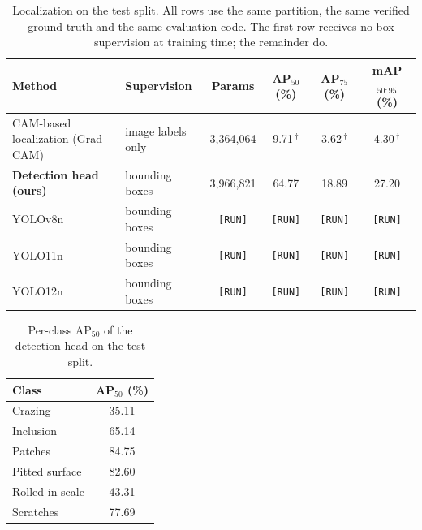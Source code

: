 \begin{table}[t]
\centering
\caption{Localization on the test split. All rows use the same partition, the same verified ground truth and the same evaluation code. The first row receives no box supervision at training time; the remainder do.}
\label{tab:localization}
\renewcommand{\arraystretch}{1.15}
\begin{tabular}{llcccc}
\toprule
\textbf{Method} & \textbf{Supervision} & \textbf{Params} & \textbf{AP$_{50}$ (\%)} & \textbf{AP$_{75}$ (\%)} & \textbf{mAP$_{50:95}$ (\%)} \\
\midrule
CAM-based localization (Grad-CAM) & image labels only & 3{,}364{,}064 & 9.71\,$^{\dagger}$ & 3.62\,$^{\dagger}$ & 4.30\,$^{\dagger}$ \\
\midrule
\textbf{Detection head (ours)} & bounding boxes & 3{,}966{,}821 & 64.77 & 18.89 & 27.20 \\
YOLOv8n & bounding boxes & \texttt{[RUN]} & \texttt{[RUN]} & \texttt{[RUN]} & \texttt{[RUN]} \\
YOLO11n & bounding boxes & \texttt{[RUN]} & \texttt{[RUN]} & \texttt{[RUN]} & \texttt{[RUN]} \\
YOLO12n & bounding boxes & \texttt{[RUN]} & \texttt{[RUN]} & \texttt{[RUN]} & \texttt{[RUN]} \\
\bottomrule
\end{tabular}
\end{table}


\begin{table}[t]
\centering
\caption{Per-class AP$_{50}$ of the detection head on the test split.}
\label{tab:detector_per_class}
\renewcommand{\arraystretch}{1.15}
\begin{tabular}{lc}
\toprule
\textbf{Class} & \textbf{AP$_{50}$ (\%)} \\
\midrule
Crazing & 35.11 \\
Inclusion & 65.14 \\
Patches & 84.75 \\
Pitted surface & 82.60 \\
Rolled-in scale & 43.31 \\
Scratches & 77.69 \\
\bottomrule
\end{tabular}
\end{table}


